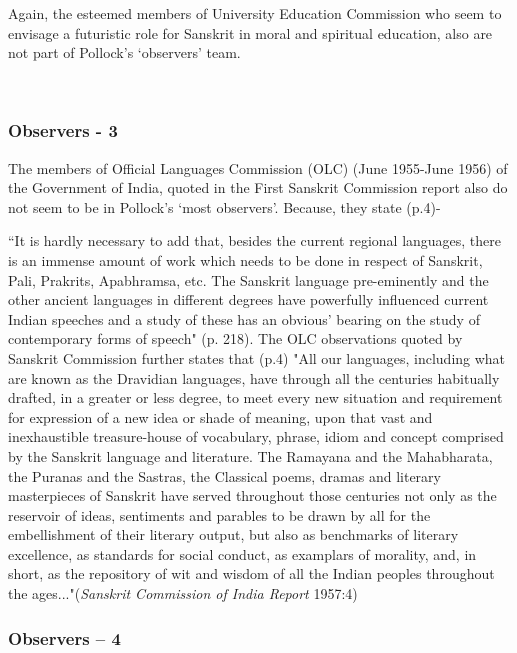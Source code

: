 Again, the esteemed members of University Education Commission who seem to envisage a futuristic role for Sanskrit in moral and spiritual education, also are not part of Pollock’s ‘observers’ team.

~\\[-40pt]

\subsubsection{Observers - 3}
\vskip -5pt

The members of Official Languages Commission (OLC) (June 1955-June 1956) of the Government of India, quoted in the First Sanskrit Commission report also do not seem to be in Pollock’s ‘most observers’. Because, they state (p.4)-
\begin{myquote}
\eleven
``It is hardly necessary to add that, besides the current regional languages, there is an immense amount of work which needs to be done in respect of Sanskrit, Pali, Prakrits, Apabhramsa, etc. The Sanskrit language pre-eminently and the other ancient languages in different degrees have powerfully influenced current Indian speeches and a study of these has an obvious' bearing on the study of contemporary forms of speech" (p. 218). The OLC observations quoted by Sanskrit Commission further states that (p.4) "All our languages, including what are known as the Dravidian languages, have through all the centuries habitually drafted, in a greater or less degree, to meet every new situation and requirement for expression of a new idea or shade of meaning, upon that vast and inexhaustible treasure-house of vocabulary, phrase, idiom and concept comprised by the Sanskrit language and literature. The Ramayana and the Mahabharata, the Puranas and the Sastras, the Classical poems, dramas and literary masterpieces of Sanskrit have served throughout those centuries not only as the reservoir of ideas, sentiments and parables to be drawn by all for the embellishment of their literary output, but also as benchmarks of literary excellence, as standards for social conduct, as examplars of morality, and, in short, as the repository of wit and wisdom of all the Indian peoples throughout the ages..."\hfill ({\sl Sanskrit Commission of India Report} 1957:4)
\end{myquote}

\subsubsection{Observers – 4}

